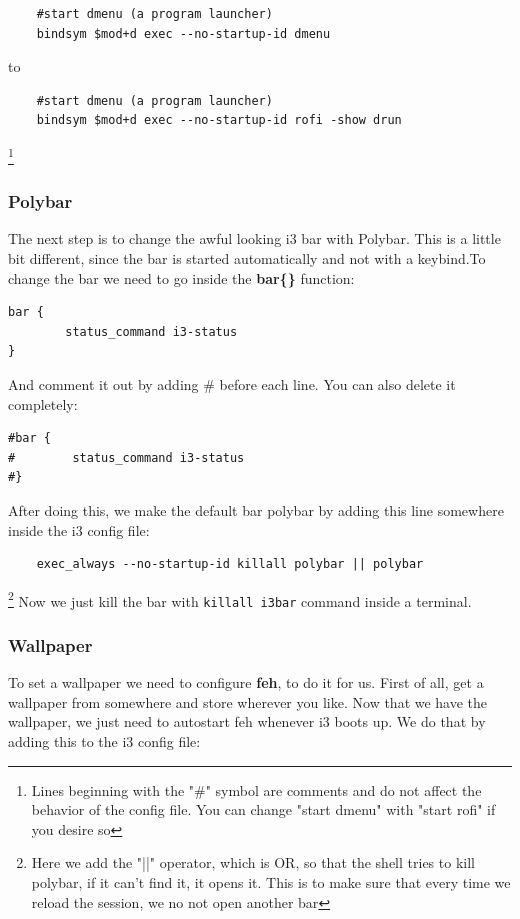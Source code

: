 \begin{lstlisting}
    #start dmenu (a program launcher)
    bindsym $mod+d exec --no-startup-id dmenu
\end{lstlisting}
to
\begin{lstlisting}
    #start dmenu (a program launcher)
    bindsym $mod+d exec --no-startup-id rofi -show drun
\end{lstlisting}
\footnote{Lines beginning with the "\#" symbol are comments and do not affect the behavior of the config file. You can change "start dmenu" with "start rofi" if you desire so}

\subsubsection{Polybar}
The next step is to change the awful looking i3 bar with Polybar.
This is a little bit different, since the bar is started automatically and not with a keybind.To change the bar we need to go inside the \textbf{bar\{\}} function:

\begin{lstlisting}
bar {
        status_command i3-status
}
\end{lstlisting}

And comment it out by adding \# before each line. You can also delete it completely:

\begin{lstlisting}
#bar {
#        status_command i3-status
#}
\end{lstlisting}

After doing this, we make the default bar polybar by adding this line somewhere inside the i3 config file:

\begin{lstlisting}
    exec_always --no-startup-id killall polybar || polybar
\end{lstlisting}

\footnote{Here we add the "||" operator, which is OR, so that the shell tries to kill polybar, if it can't find it, it opens it. This is to make sure that every time we reload the session, we no not open another bar}
Now we just kill the bar with \texttt{killall i3bar} command inside a terminal.

\subsubsection{Wallpaper}
To set a wallpaper we need to configure \textbf{feh}, to do it for us. First of all, get a wallpaper from somewhere and store wherever you like. Now that we have the wallpaper, we just need to autostart feh whenever i3 boots up. We do that by adding this to the i3 config file:

